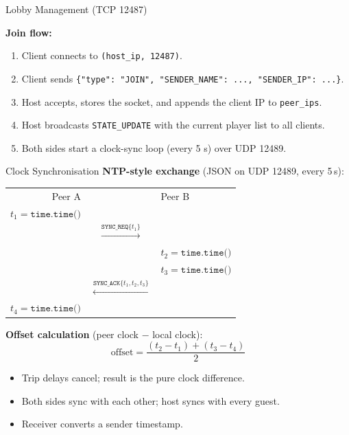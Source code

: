 \documentclass[t]{beamer}
\begin{document}
\begin{frame}{Lobby Management (TCP 12487)}

\vspace{0.3cm}
\textbf{Join flow:}
\begin{enumerate}
    \item Client connects to \texttt{(host\_ip, 12487)}.
    \item Client sends \texttt{\{"type": "JOIN", "SENDER\_NAME": ..., "SENDER\_IP": ...\}}.
    \item Host accepts, stores the socket, and appends the client IP to \texttt{peer\_ips}.
    \item Host broadcasts \texttt{STATE\_UPDATE} with the current player list to all clients.
    \item Both sides start a clock-sync loop (every 5 s) over UDP 12489.
\end{enumerate}

\end{frame}

\begin{frame}{Clock Synchronisation}
\vspace{-0.5cm}  
\textbf{NTP-style exchange} (JSON on UDP 12489, every 5\,s):

\vspace{0.2cm}
\begin{center}
\small
\begin{tabular}{rcl}
    Peer A & & Peer B \\
    $t_1 = \texttt{time.time()}$ & & \\
    & $\xrightarrow{\texttt{SYNC\_REQ}\{t_1\}}$ & \\
    & & $t_2 = \texttt{time.time()}$ \\
    & & $t_3 = \texttt{time.time()}$ \\
    & $\xleftarrow{\texttt{SYNC\_ACK}\{t_1,t_2,t_3\}}$ & \\
    $t_4 = \texttt{time.time()}$ & & \\
\end{tabular}
\end{center}

\vspace{0.3cm}
\textbf{Offset calculation} (peer clock $-$ local clock):
\[
    \text{offset} = \frac{(t_2 - t_1) + (t_3 - t_4)}{2}
\]

\begin{itemize}
    \item Trip delays cancel; result is the pure clock difference.
    \item Both sides sync with each other; host syncs with every guest.
    \item Receiver converts a sender timestamp.
\end{itemize}
\end{frame}
\end{document}

